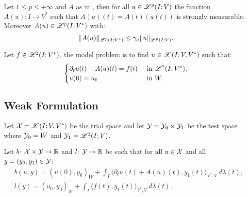 \begin{lemma}
    Let $1 \leq p \leq +\infty$ and  $A$ as in , then for all $u \in \mathscr{L}^{p}(I; V)$ the function $A(u) \colon I \rightarrow V^*$ such that $A(u)(t) = A(t)(u(t))$ is strongly measurable. Moreover $A(u) \in \mathscr{L}^{p}(I; V^*)$ with:
    \begin{align}
        \lVert A(u) \rVert_{\mathscr{L}^{p}(I; V^*)} \leq \gamma_{a} \lVert u \rVert_{\mathscr{L}^{p}(I; V)}.
    \end{align}
\end{lemma}

\begin{definition}
    Let $f \in \mathscr{L}^{2}(I; V^*)$, the model problem is to find $u \in \mathscr{X}(I; V, V^*)$ such that:
    \begin{align}
        \begin{cases} \label{equation:model}
            \partial_t u(t) + A(u)(t) = f(t) & \text{ in } \mathscr{L}^{2}(I; V^*), \\
            u(0) = u_0 & \text{ in } W.
        \end{cases}
    \end{align}
\end{definition}

\newpage
\subsection{Weak Formulation} \label{subsection:weak_formulation}

\begin{definition}
    Let $\mathcal{X} = \mathscr{X}(I; V, V^*)$ be the trial space and let $\mathcal{Y} = \mathcal{Y}_0 \times \mathcal{Y}_1$ be the test space where $\mathcal{Y}_0 = W$ and $\mathcal{Y}_1 = \mathscr{L}^{2}(I; V)$.
\end{definition}

\begin{definition}[$b$ and $l$]
    Let $b \colon \mathcal{X} \times \mathcal{Y} \rightarrow \mathbb{R}$ and $l \colon \mathcal{Y} \rightarrow \mathbb{R}$ be such that for all $u \in \mathcal{X}$ and all $y = (y_0, y_1) \in \mathcal{Y}$:
    \begin{align}
        & b(u, y) = \left( u(0), y_0 \right)_W + \int_I \langle \partial_t u(t) + A(u)(t), y_1(t) \rangle_{V^*, V} ~ d \lambda(t), \\
        & l(y) = \left( u_0, y_0 \right)_W + \int_I \langle f(t), y_1(t) \rangle_{V^*, V} ~ d \lambda(t).
    \end{align}
\end{definition}

